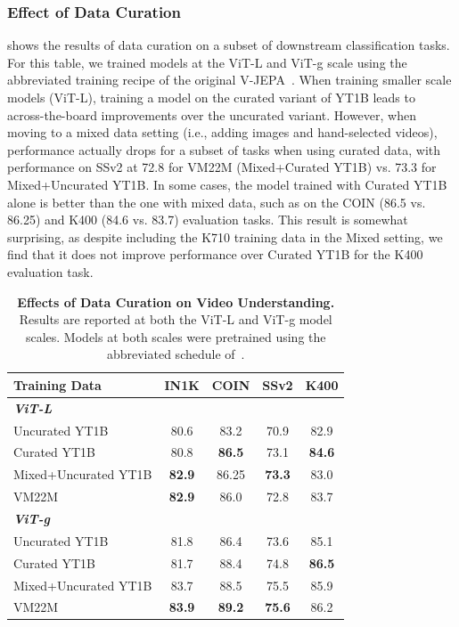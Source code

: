 \documentclass[]{fairmeta}
\begin{document}
\subsubsection{Effect of Data Curation}
\label{app:data_curation_app_additional_results}
 shows the results of data curation on a subset of downstream  classification tasks.
For this table, we trained models at the ViT-L and ViT-g scale using the abbreviated training recipe of the original V-JEPA~\citep{bardes2024revisiting}.
When training smaller scale models (ViT-L), training a model on the curated variant of YT1B leads to across-the-board improvements over the uncurated variant.
However, when moving to a mixed data setting (i.e., adding images and hand-selected videos), performance actually drops for a subset of tasks when using curated data, with performance on SSv2 at 72.8 for VM22M (Mixed+Curated YT1B) vs. 73.3 for Mixed+Uncurated YT1B.
In some cases, the model trained with Curated YT1B alone is better than the one with mixed data, such as on the COIN (86.5 vs. 86.25) and K400 (84.6 vs. 83.7) evaluation tasks.
This result is somewhat surprising, as despite including the K710 training data in the Mixed setting, we find that it does not improve performance over Curated YT1B for the K400 evaluation task.
\begin{table}[h]
    \centering
    \small
    \caption{
      \textbf{Effects of Data Curation on Video Understanding.} Results are reported at both the ViT-L and ViT-g model scales. Models at both scales were pretrained using the abbreviated schedule of~\citet{bardes2024revisiting}.}
    \begin{tabular}{lcccc}
    \toprule
    Training Data & IN1K & COIN & SSv2 & K400  \\
    \midrule
    \multicolumn{3}{l}{\bf\it ViT-L} \\
    Uncurated YT1B & 80.6 & 83.2 & 70.9 & 82.9 \\
    Curated YT1B & 80.8 & \bf 86.5 & 73.1 & \bf 84.6 \\
    Mixed+Uncurated YT1B & \bf 82.9 & 86.25 & \bf 73.3 & 83.0 \\
    VM22M  & \bf 82.9 & 86.0 & 72.8 & 83.7 \\
    \midrule
    \multicolumn{3}{l}{\bf\it ViT-g} \\
    Uncurated YT1B & 81.8 & 86.4 & 73.6 & 85.1 \\
    Curated YT1B & 81.7 & 88.4 & 74.8 & \bf 86.5 \\
    Mixed+Uncurated YT1B & 83.7 & 88.5 & 75.5 & 85.9 \\
    VM22M & \bf 83.9 & \bf 89.2 & \bf 75.6 & 86.2 \\
    \end{tabular}
    \label{table:curated_probe_results}
\end{table}
\end{document}
